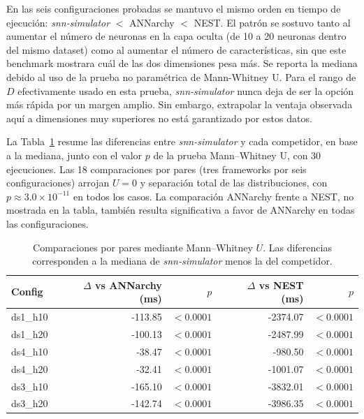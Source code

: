 
En las seis configuraciones probadas se mantuvo el mismo orden en tiempo de ejecución: \textit{snn-simulator} \(<\) ANNarchy \(<\) NEST. El patrón se sostuvo tanto al aumentar el número de neuronas en la capa oculta (de 10 a 20 neuronas dentro del mismo dataset) como al aumentar el número de características, sin que este benchmark mostrara cuál de las dos dimensiones pesa más. Se reporta la mediana debido al uso de la prueba no paramétrica de Mann-Whitney U. Para el rango de $D$ efectivamente usado en esta prueba, \textit{snn-simulator} nunca deja de ser la opción más rápida por un margen amplio. Sin embargo, extrapolar la ventaja observada aquí a dimensiones muy superiores no está garantizado por estos datos.



La Tabla~\ref{tab:framework-mannwhitney-res} resume las diferencias entre \textit{snn-simulator} y cada competidor, en base a la mediana, junto con el valor \(p\) de la prueba Mann--Whitney U, con 30 ejecuciones. Las 18 comparaciones por pares (tres frameworks por seis configuraciones) arrojan \(U = 0\) y separación total de las distribuciones, con \(p \approx 3{.}0 \times 10^{-11}\) en todos los casos. La comparación ANNarchy frente a NEST, no mostrada en la tabla, también resulta significativa a favor de ANNarchy en todas las configuraciones.

\begin{table}[htbp]
\centering
\small
\caption{Comparaciones por pares mediante Mann--Whitney \(U\). Las diferencias corresponden a la mediana de \textit{snn-simulator} menos la del competidor.}
\label{tab:framework-mannwhitney-res}
\begin{tabular}{lrrrr}
\toprule
Config & $\Delta$ vs ANNarchy (ms) & $p$ & $\Delta$ vs NEST (ms) & $p$ \\
\midrule
ds1\_h10 & -113.85 & $<0.0001$ & -2374.07 & $<0.0001$ \\
ds1\_h20 & -100.13 & $<0.0001$ & -2487.99 & $<0.0001$ \\
ds4\_h10 &  -38.47 & $<0.0001$ &  -980.50 & $<0.0001$ \\
ds4\_h20 &  -32.41 & $<0.0001$ & -1001.07 & $<0.0001$ \\
ds3\_h10 & -165.10 & $<0.0001$ & -3832.01 & $<0.0001$ \\
ds3\_h20 & -142.74 & $<0.0001$ & -3986.35 & $<0.0001$ \\
\bottomrule
\end{tabular}
\end{table}

